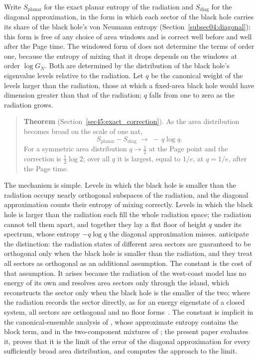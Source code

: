\documentclass[11pt,letterpaper]{article}
\theoremstyle{plain}
\theoremstyle{definition}
\theoremstyle{remark}
\begin{document}
Write $S_{\mathrm{planar}}$ for the exact planar entropy of the radiation and $S_{\mathrm{diag}}$ for the diagonal approximation, in the form in which each sector of the black hole carries its share of the black hole's von Neumann entropy (Section~\ref{subsec04:diagonal}); this form is free of any choice of area windows and is correct well before and well after the Page time. The windowed form of \citet{marolfwangwang2020} does not determine the terms of order one, because the entropy of mixing that it drops depends on the windows at order $\log G_N$. Both are determined by the distribution of the black hole's eigenvalue levels relative to the radiation. Let $q$ be the canonical weight of the levels larger than the radiation, those at which a fixed-area black hole would have dimension greater than that of the radiation; $q$ falls from one to zero as the radiation grows.

\begin{quote}
\textbf{Theorem} (Section~\ref{sec45:exact_correction}). As the area distribution becomes broad on the scale of one nat,
\begin{equation}
\label{eq01:main}
S_{\mathrm{planar}} - S_{\mathrm{diag}} \;\longrightarrow\; -\,q\log q .
\end{equation}
For a symmetric area distribution $q \to \tfrac12$ at the Page point and the correction is $\tfrac12\log 2$; over all $q$ it is largest, equal to $1/e$, at $q = 1/e$, after the Page time.
\end{quote}

The mechanism is simple. Levels in which the black hole is smaller than the radiation occupy nearly orthogonal subspaces of the radiation, and the diagonal approximation counts their entropy of mixing correctly. Levels in which the black hole is larger than the radiation each fill the whole radiation space; the radiation cannot tell them apart, and together they lay a flat floor of height $q$ under its spectrum, whose entropy $-q\log q$ the diagonal approximation misses. \citet{marolfwangwang2020} anticipate the distinction: the radiation states of different area sectors are guaranteed to be orthogonal only when the black hole is smaller than the radiation, and they treat all sectors as orthogonal as an additional assumption. The constant is the cost of that assumption. It arises because the radiation of the west-coast model has no energy of its own and resolves area sectors only through the island, which reconstructs the sector only when the black hole is the smaller of the two; where the radiation records the sector directly, as for an energy eigenstate of a closed system, all sectors are orthogonal and no floor forms~\citep{murthysrednicki2019}. The constant is implicit in the canonical-ensemble analysis of \citet{pssyetal2022}, whose approximate entropy contains the block term, and in the two-component mixtures of \citet{akerspenington2021}; the present paper evaluates it, proves that it is the limit of the error of the diagonal approximation for every sufficiently broad area distribution, and computes the approach to the limit.
\end{document}
